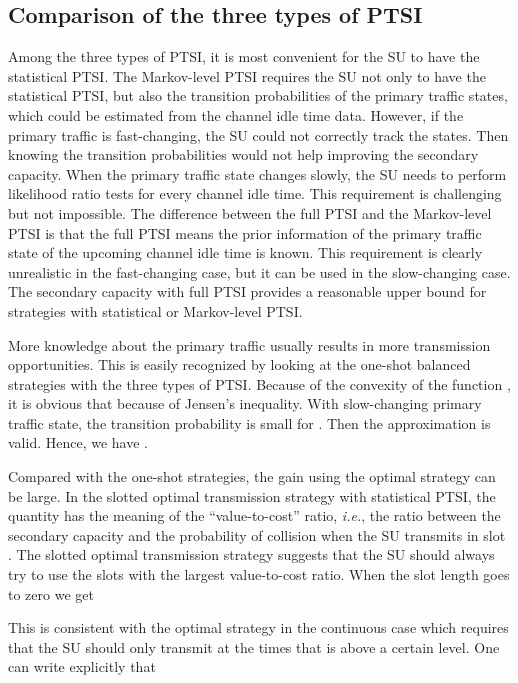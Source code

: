 \documentclass[10pt,final,journal,letterpaper]{IEEEtran}
\newcommand{\ie}{\emph{i.e.}, }
\begin{document}
\subsection{Comparison of the three types of PTSI}
Among the three types of PTSI, it is most convenient for the SU to have the statistical PTSI. The Markov-level PTSI requires the SU not only to have the statistical PTSI, but also the transition probabilities of the primary traffic states, which could be estimated from the channel idle time data. However, if the primary traffic is fast-changing, the SU could not correctly track the states. Then knowing the transition probabilities would not help improving the secondary capacity. When the primary traffic state changes slowly, the SU needs to perform  likelihood ratio tests for every channel idle time. This requirement is challenging but not impossible. The difference between the full PTSI and the Markov-level PTSI is that the full PTSI means the prior information of the primary traffic state of the upcoming channel idle time is known. This requirement is clearly unrealistic in the fast-changing case, but it can be used in the slow-changing case. The secondary capacity with full PTSI provides a reasonable upper bound for strategies with statistical or Markov-level PTSI.

More knowledge about the primary traffic usually results in more transmission opportunities. This is easily recognized by looking at the one-shot balanced strategies with the three types of PTSI. Because of the convexity of the function , it is obvious that  because of Jensen's inequality. With slow-changing primary traffic state, the transition probability  is small for . Then the approximation  is valid. Hence, we have .

\par
Compared with the one-shot strategies, the gain using the optimal strategy can be large. In the slotted optimal transmission strategy with statistical PTSI, the quantity  has the meaning of the ``value-to-cost'' ratio, \ie the ratio between the secondary capacity and the probability of collision when the SU transmits in slot . The slotted optimal transmission strategy suggests that the SU should always try to use the slots with the largest value-to-cost ratio. When the slot length  goes to zero we get

This is consistent with the optimal strategy in the continuous case which requires that the SU should only transmit at the times that  is above a certain level. One can write explicitly that
\end{document}
